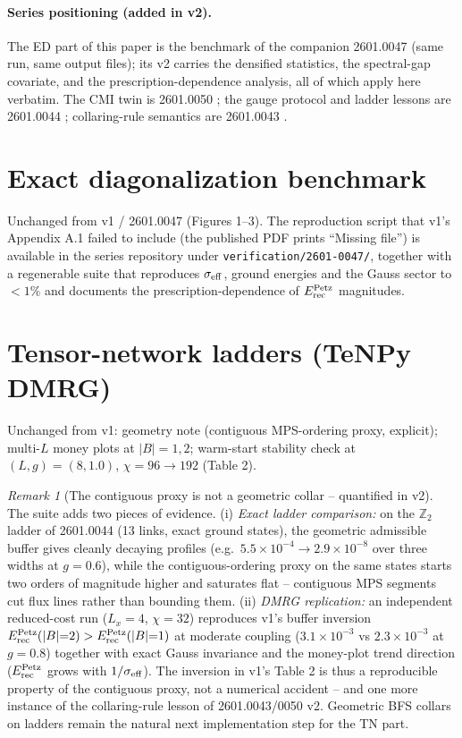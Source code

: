 \documentclass[11pt]{article}
\theoremstyle{remark}
\newtheorem{remark}{Remark}[section]
\newcommand{\Erec}{E^{\rm Petz}_{\rm rec}}
\begin{document}
\paragraph{Series positioning (added in v2).} The ED part of this paper
is the benchmark of the companion 2601.0047 \cite{S0047} (same run, same
output files); its v2 carries the densified statistics, the spectral-gap
covariate, and the prescription-dependence analysis, all of which apply
here verbatim. The CMI twin is 2601.0050 \cite{S0050}; the gauge protocol
and ladder lessons are 2601.0044 \cite{S0044}; collaring-rule semantics
are 2601.0043 \cite{S0043}.

\section{Exact diagonalization benchmark}
Unchanged from v1 / 2601.0047 (Figures 1--3). The reproduction script that
v1's Appendix A.1 failed to include (the published PDF prints ``Missing
file'') is available in the series repository under
\texttt{verification/2601-0047/}, together with a regenerable suite that
reproduces $\sigma_{\rm eff}$, ground energies and the Gauss sector to
$<1\%$ and documents the prescription-dependence of $\Erec$ magnitudes.

\section{Tensor-network ladders (TeNPy DMRG)}
Unchanged from v1: geometry note (contiguous MPS-ordering proxy,
explicit); multi-$L$ money plots at $|B| = 1, 2$; warm-start stability
check at $(L, g) = (8, 1.0)$, $\chi = 96 \to 192$ (Table 2).

\begin{remark}[The contiguous proxy is not a geometric collar --
quantified in v2]
\label{rem:proxy}
The suite adds two pieces of evidence. (i) \emph{Exact ladder
comparison:} on the $\mathbb{Z}_2$ ladder of 2601.0044 (13 links, exact
ground states), the geometric admissible buffer gives cleanly decaying
profiles (e.g.\ $5.5\times10^{-4} \to 2.9\times10^{-8}$ over three
widths at $g = 0.6$), while the contiguous-ordering proxy on the same
states starts two orders of magnitude higher and saturates flat --
contiguous MPS segments cut flux lines rather than bounding them.
(ii) \emph{DMRG replication:} an independent reduced-cost run ($L_x =
4$, $\chi = 32$) reproduces v1's buffer inversion
$\Erec(|B|{=}2) > \Erec(|B|{=}1)$ at moderate coupling
($3.1\times10^{-3}$ vs $2.3\times10^{-3}$ at $g = 0.8$) together with
exact Gauss invariance and the money-plot trend direction ($\Erec$
grows with $1/\sigma_{\rm eff}$). The inversion in v1's Table 2 is thus
a reproducible property of the contiguous proxy, not a numerical
accident -- and one more instance of the collaring-rule lesson of
2601.0043/0050 v2. Geometric BFS collars on ladders remain the natural
next implementation step for the TN part.
\end{remark}
\end{document}
